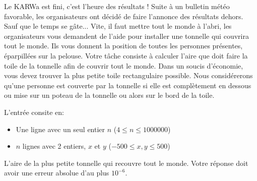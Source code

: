 \problemname{\problemyamlname}


\newcommand{\maxa}{123456789}

Le KARWa est fini, c'est l'heure des résultats ! Suite à un bulletin météo favorable, les organisateurs ont décidé de faire l'annonce des résultats dehors. Sauf que le temps se gâte... Vite, il faut mettre tout le monde à l'abri, les organisateurs vous demandent de l'aide pour installer une tonnelle qui couvrira tout le monde.
Ils vous donnent la position de toutes les personnes présentes, éparpillées sur la pelouse. Votre tâche consiste à calculer l'aire que doit faire la toile de la tonnelle afin de couvrir tout le monde. Dans un soucis d'économie, vous devez trouver la plus petite toile rectangulaire possible.
Nous considérerons qu'une personne est couverte par la tonnelle si elle est complètement en dessous ou mise sur un poteau de la tonnelle ou alors sur le bord de la toile.

\begin{Input}
  L'entrée consite en:
  \begin{itemize}
    \item Une ligne avec un seul entier \(n\) (\(4 \leq n \leq 1000000\))
    \item \(n\) lignes avec 2 entiers, \(x\) et \(y\) (\(-500 \leq x, y \leq 500\))
  \end{itemize}
\end{Input}

\begin{Output}
  L'aire de la plus petite tonnelle qui recouvre tout le monde.
  Votre réponse doit avoir une erreur absolue d'au plus $10^{-6}$.
\end{Output}
